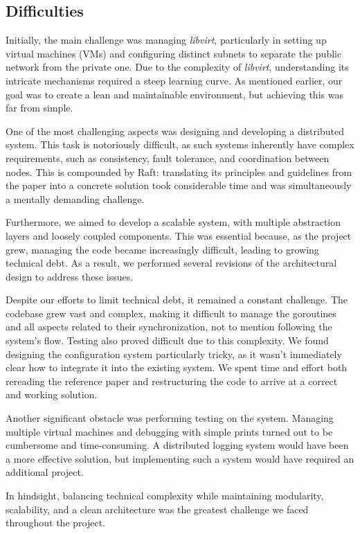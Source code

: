 \subsection{Difficulties}
Initially, the main challenge was managing \textit{libvirt}, particularly in setting up virtual 
machines (VMs) and configuring distinct subnets to separate the public network from the
private one. Due to the complexity of \textit{libvirt}, understanding its intricate mechanisms required 
a steep learning curve. As mentioned earlier, our goal was to create a lean and 
maintainable environment, but achieving this was far from simple.

One of the most challenging aspects was designing and developing a distributed system. 
This task is notoriously difficult, as such systems inherently have complex requirements, 
such as consistency, fault tolerance, and coordination between nodes. This is 
compounded by Raft: translating its principles and guidelines from the paper \cite{1} 
into a concrete solution took considerable time and was simultaneously a mentally demanding challenge.

Furthermore, we aimed to develop a scalable system, with multiple abstraction layers and 
loosely coupled components. This was essential because, as the project grew, managing 
the code became increasingly difficult, leading to growing technical debt. As a result, 
we performed several revisions of the architectural design to address these issues.

Despite our efforts to limit technical debt, it remained a constant challenge. The codebase 
grew vast and complex, making it difficult to manage the goroutines and all aspects related 
to their synchronization, not to mention following the system's flow. Testing also proved 
difficult due to this complexity. We found designing the configuration system particularly 
tricky, as it wasn't immediately clear how to integrate it into the existing system. We 
spent time and effort both rereading the reference paper \cite{1} and restructuring the 
code to arrive at a correct and working solution.

Another significant obstacle was performing testing on the system. Managing multiple virtual 
machines and debugging with simple prints turned out to be cumbersome and time-consuming. 
A distributed logging system would have been a more effective solution, but implementing 
such a system would have required an additional project.

In hindsight, balancing technical complexity while maintaining modularity, scalability, 
and a clean architecture was the greatest challenge we faced throughout the project.

